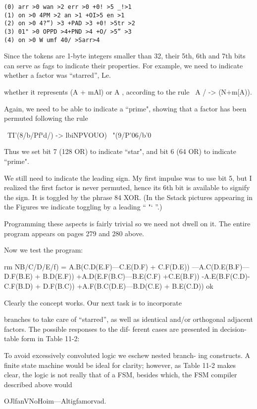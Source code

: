 \begin{verbatim}
(0) arr >0 wan >2 err >0 +0! >5 _!>1
(1) on >0 4PM >2 an >1 +OI>5 en >1
(2) on >0 4?“) >3 +PAD >3 +0! >5tr >2
(3) 01" >0 OPPD >4+PND >4 +O/ >5” >3
(4) on >0 W umf 40/ >Sarr>4
\end{verbatim}

Since the tokens are 1-byte integers smaller than 32, their 5th, 6th
and 7th bits can serve as fags to indicate their properties. For
example, we need to indicate whether a factor was “starred”, Le.

whether it represents (A + mAl) or A , according to the rule
\ A / -> (N+m[A)).

Again, we need to be able to indicate a “prime", showing that a
factor has been permuted following the rule

\ TI’(8/b/Pf°d/) -> lbiNPVOUO) ~"(9/P'06/b'0

Thus we set bit 7 (128 OR) to indicate “star", and bit 6 (64 OR)
to indicate “prime".

We still need to indicate the leading sign. My first impulse was to
use bit 5, but I realized the first factor is never permuted, hence
its 6th bit is available to signify the sign. It is toggled by the phrase
84 XOR. (In the Sstack pictures appearing in the Figures we
indicate toggling by a leading “ "‘ ”.)

Programming these aspects is fairly trivial so we need not dwell
on it. The entire program appears on pages 279 and 280 above.

Now we test the program:

rm NB/C/D/E/f) =
A.B(C.D(E.F)—C.E(D.F) + C.F(D.E))
—A.C(D.E(B.F)—D.F(B.E) + B.D(E.F))
+A.D(E.F(B.C)—B.E(C.F) +C.E(B.F))
-A.E(B.F(C.D)-C.F(B.D) + D.F(B.C))
+A.F(B.C(D.E)—B.D(C.E) + B.E(C.D)) ok

Clearly the concept works. Our next task is to incorporate

branches to take care of “starred”, as well as identical and/or
orthogonal adjacent factors. The possible responses to the dif-
ferent cases are presented in decision-table form in Table 11-2:

To avoid excessively convoluted logic we eschew nested branch-
ing constructs. A finite state machine would be ideal for clarity;
however, as Table 11-2 makes clear, the logic is not really that of
a FSM, besides which, the FSM compiler described above would

OJlfanVNoHoim—Altigfamorvad.

 

